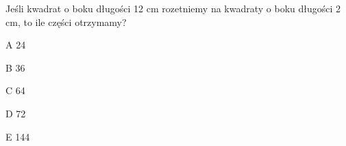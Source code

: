 \begin{tresc}
Jeśli kwadrat o boku długości 12 cm rozetniemy na kwadraty o boku długości 2 cm, to ile części otrzymamy?
\end{tresc}
\begin{wariant}{A} 24 \end{wariant}
\begin{wariant}{B} 36 \end{wariant}
\begin{wariant}{C} 64 \end{wariant}
\begin{wariant}{D} 72 \end{wariant}
\begin{wariant}{E} 144 \end{wariant}
